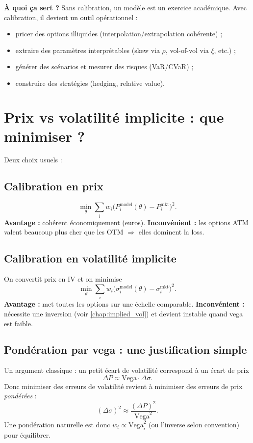 \documentclass[11pt,a4paper]{report}
\newcommand{\1}{\mathbbm{1}}
\newcommand{\vega}{\mathrm{Vega}}
\theoremstyle{definition}
\theoremstyle{plain}
\theoremstyle{remark}
\begin{document}
\textbf{À quoi ça sert ?}
Sans calibration, un modèle est un exercice académique.
Avec calibration, il devient un outil opérationnel :
\begin{itemize}
  \item pricer des options illiquides (interpolation/extrapolation cohérente) ;
  \item extraire des paramètres interprétables (skew via $\rho$, vol-of-vol via $\xi$, etc.) ;
  \item générer des scénarios et mesurer des risques (VaR/CVaR) ;
  \item construire des stratégies (hedging, relative value).
\end{itemize}

\section{Prix vs volatilité implicite : que minimiser ?}
Deux choix usuels :

\subsection{Calibration en prix}
\[
\min_\theta \sum_i w_i\bigl(P_i^{\mathrm{model}}(\theta)-P_i^{\mathrm{mkt}}\bigr)^2.
\]
\textbf{Avantage :} cohérent économiquement (euros).
\textbf{Inconvénient :} les options ATM valent beaucoup plus cher que les OTM $\Rightarrow$ elles dominent la loss.

\subsection{Calibration en volatilité implicite}
On convertit prix en IV et on minimise
\[
\min_\theta \sum_i w_i\bigl(\sigma_i^{\mathrm{model}}(\theta)-\sigma_i^{\mathrm{mkt}}\bigr)^2.
\]
\textbf{Avantage :} met toutes les options sur une échelle comparable.
\textbf{Inconvénient :} nécessite une inversion (voir \cref{chap:implied_vol}) et devient instable quand vega est faible.

\subsection{Pondération par vega : une justification simple}
Un argument classique : un petit écart de volatilité correspond à un écart de prix
\[
\Delta P \approx \vega \cdot \Delta \sigma.
\]
Donc minimiser des erreurs de volatilité revient à minimiser des erreurs de prix \emph{pondérées} :
\[
(\Delta \sigma)^2 \approx \frac{(\Delta P)^2}{\vega^2}.
\]
Une pondération naturelle est donc $w_i \propto \vega_i^2$ (ou l'inverse selon convention) pour équilibrer.
\end{document}
